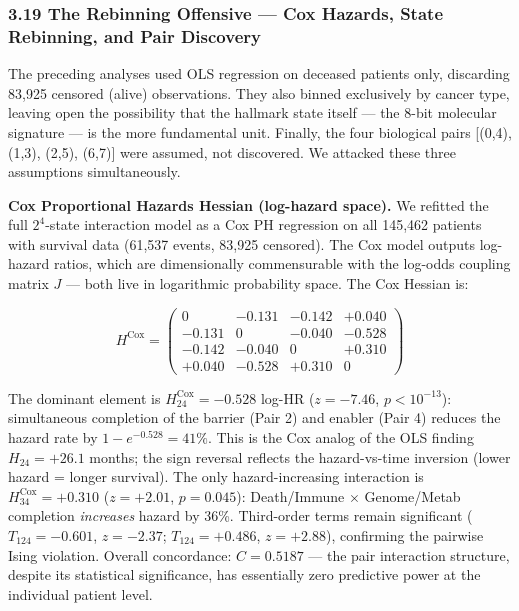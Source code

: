 \documentclass[
  11pt,
]{article}
\begin{document}
\subsubsection{3.19 The Rebinning Offensive --- Cox Hazards, State
Rebinning, and Pair
Discovery}\label{the-rebinning-offensive-cox-hazards-state-rebinning-and-pair-discovery}

The preceding analyses used OLS regression on deceased patients only,
discarding 83,925 censored (alive) observations. They also binned
exclusively by cancer type, leaving open the possibility that the
hallmark state itself --- the 8-bit molecular signature --- is the more
fundamental unit. Finally, the four biological pairs {[}(0,4), (1,3),
(2,5), (6,7){]} were assumed, not discovered. We attacked these three
assumptions simultaneously.

\textbf{Cox Proportional Hazards Hessian (log-hazard space).} We
refitted the full \(2^4\)-state interaction model as a Cox PH regression
on all 145,462 patients with survival data (61,537 events, 83,925
censored). The Cox model outputs log-hazard ratios, which are
dimensionally commensurable with the log-odds coupling matrix \(J\) ---
both live in logarithmic probability space. The Cox Hessian is:

\[H^{\text{Cox}} = \begin{pmatrix} 0 & -0.131 & -0.142 & +0.040 \\ -0.131 & 0 & -0.040 & -0.528 \\ -0.142 & -0.040 & 0 & +0.310 \\ +0.040 & -0.528 & +0.310 & 0 \end{pmatrix} \tag{8}\]

The dominant element is \(H^{\text{Cox}}_{24} = -0.528\) log-HR
(\(z = -7.46\), \(p < 10^{-13}\)): simultaneous completion of the
barrier (Pair 2) and enabler (Pair 4) reduces the hazard rate by
\(1 - e^{-0.528} = 41\%\). This is the Cox analog of the OLS finding
\(H_{24} = +26.1\) months; the sign reversal reflects the hazard-vs-time
inversion (lower hazard = longer survival). The only hazard-increasing
interaction is \(H^{\text{Cox}}_{34} = +0.310\) (\(z = +2.01\),
\(p = 0.045\)): Death/Immune \(\times\) Genome/Metab completion
\emph{increases} hazard by 36\%. Third-order terms remain significant
(\(T_{124} = -0.601\), \(z = -2.37\); \(T_{124} = +0.486\),
\(z = +2.88\)), confirming the pairwise Ising violation. Overall
concordance: \(C = 0.5187\) --- the pair interaction structure, despite
its statistical significance, has essentially zero predictive power at
the individual patient level.
\end{document}
